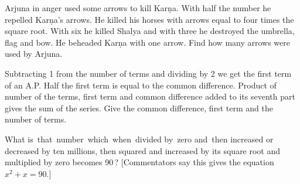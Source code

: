 \documentclass[]{article}
\begin{document}
{\begin{quote}  {
}  \end{quote}

Arjuna in anger used some arrows to kill Karṇa. With half the number he
repelled Karṇa's arrows. He killed his horses with arrows equal to four
times the square root. With six he killed Shalya and with three he
destroyed the umbrella, flag and bow. He beheaded Karṇa with one arrow.
Find how many arrows were used by Arjuna.

\begin{quote}  {
}  \end{quote}

{Subtracting 1 from the number of terms and dividing by 2 we get the first term of an A.P. Half the first term is equal to the common difference. Product of number of the terms, first term and common difference added to its seventh part gives the sum of the series. Give the common difference, first term and the number of terms.}

\newpage
\large

\begin{quote}  {
}  \end{quote}

What is \,that \,number \,which \,when \,divided by \,zero and \,then
increased or
decreased by ten millions, then squared and increased by its square root
and multiplied by zero becomes 90\,? [Commentators say this gives the
equation $x^{2} + x =90.$]

\begin{quote}  {
}  \end{quote}

}
\end{document}
